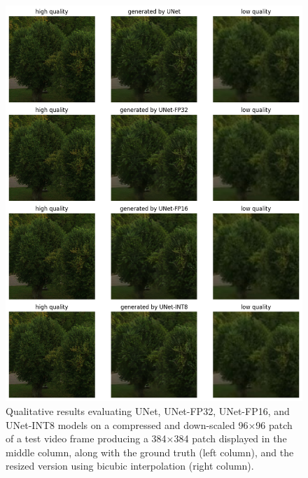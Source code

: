 \begin{figure}[ht]
\includegraphics[width=1.0\textwidth]{static/03_unet_qualitative_results.png}
\caption{Qualitative results evaluating UNet, UNet-FP32, UNet-FP16, and UNet-INT8 models on a compressed and down-scaled 96$\times$96 patch of a test video frame producing a 384$\times$384 patch displayed in the middle column, along with the ground truth (left column), and the resized version using bicubic interpolation (right column).}
\label{fig:trees-qualitative-unet}
\end{figure}

